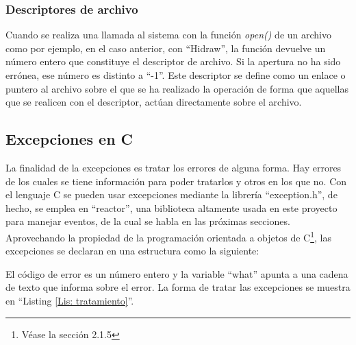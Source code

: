 \subsubsection{Descriptores de archivo}\label{s2_1_3_2}

Cuando se realiza una llamada al sistema con la función {\itshape open()} de un archivo como por ejemplo, en el caso anterior, con ``Hidraw'', la función devuelve un número entero que constituye el descriptor de archivo. Si la apertura no ha sido errónea, ese número es distinto a ``-1''. Este descriptor se define como un enlace o puntero al archivo sobre el que se ha realizado la operación de forma que aquellas que se realicen con el descriptor, actúan directamente sobre el archivo.

\subsection{Excepciones en C} \label{s2_1_4}

La finalidad de la excepciones es tratar los errores de alguna forma. Hay errores de los cuales se tiene información para poder tratarlos y otros en los que no. Con el lenguaje C se pueden usar excepciones mediante la librería ``exception.h'', de hecho, se emplea en ``reactor'', una biblioteca altamente usada en este proyecto para manejar eventos, de la cual se habla en las próximas secciones. Aprovechando la propiedad de la programación orientada a objetos de C\footnote{Véase la sección 2.1.5}, las excepciones se declaran en una estructura como la siguiente: 

El código de error es un número entero y la variable ``what'' apunta a una cadena de texto que informa sobre el error.
La forma de tratar las excepciones se muestra en ``Listing \ref{Lis: tratamiento}''.


